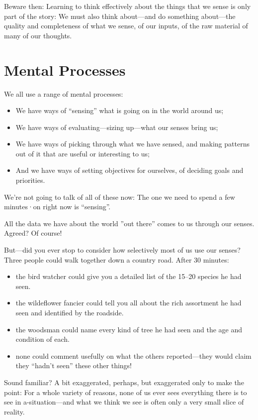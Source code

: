 \documentclass[a5paper]{article}
\begin{document}
Beware then: Learning to think effectively about the things that we sense is only part of the story: We must also think about---and do something about---the quality and completeness of what we sense, of our inputs, of the raw material of many of our thoughts.

\section*{Mental Processes}
We all use a range of mental processes:
\begin{itemize}
  \item We have ways of ``sensing'' what is going on in the world around us;
  \item We have ways of evaluating---sizing up---what our senses bring us;
  \item We have ways of picking through what we have sensed, and making patterns out of it that are useful or interesting to us;
  \item And we have ways of setting objectives for ourselves, of deciding goals and priorities.
\end{itemize}
We're not going to talk of all of these now: The one we need to spend a few minutes·on right now is ``sensing''.

All the data we have about the world ''out there'' comes to us through our senses.
Agreed?
Of course!

But---did you ever stop to consider how selectively most of us use our senses?
Three people could walk together down a country road.
After 30 minutes:
\begin{itemize}
  \item the bird watcher could give you a detailed list of the 15--20 species he had seen.
  \item the wildeflower fancier could tell you all about the rich assortment he had seen and identified by the roadside.
  \item the woodsman could name every kind of tree he had seen and the age and condition of each.
  \item none could comment usefully on what the others reported---they would claim they ``hadn't seen'' these other things!
\end{itemize}

Sound familiar?
A bit exaggerated, perhaps, but exaggerated only to make the point: For a whole variety of reasons, none of us ever sees everything there is to see in a-situation---and what we think we see is often only a very small slice of reality.
\end{document}
